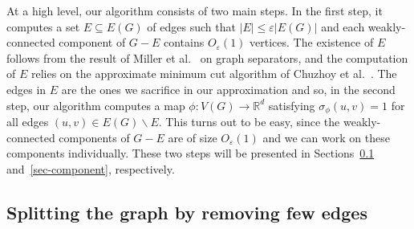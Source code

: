 At a high level, our algorithm consists of two main steps.
In the first step, it computes a set $E \subseteq E(G)$ of edges such that $|E| \leq \varepsilon |E(G)|$ and each weakly-connected component of $G - E$ contains $O_\varepsilon(1)$ vertices.
The existence of $E$ follows from the result of Miller et al.~\cite{miller:1997} on graph separators, and the computation of $E$ relies on the approximate minimum cut algorithm of Chuzhoy et al.~\cite{chuzhoy2020deterministic}.
The edges in $E$ are the ones we sacrifice in our approximation and so, in the second step, our algorithm computes a map $\phi:V(G) \rightarrow \mathbb{R}^d$ satisfying $\sigma_\phi(u,v) = 1$ for all edges $(u,v) \in E(G) \backslash E$.
This turns out to be easy, since the weakly-connected components of $G - E$ are of size $O_\varepsilon(1)$ and we can work on these components individually.
These two steps will be presented in Sections~\ref{sec-split} and~\ref{sec-component}, respectively.

\subsection{Splitting the graph by removing few edges} \label{sec-split}

